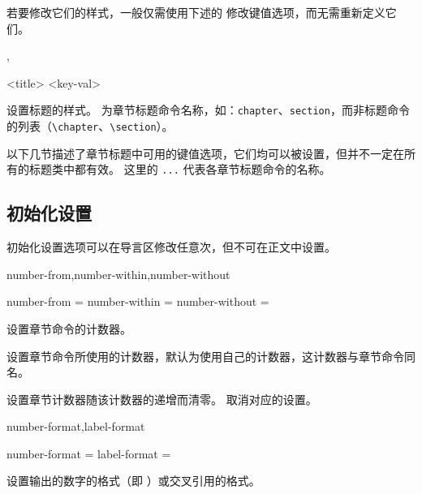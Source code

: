 \documentclass[twoside]{book}
\begin{document}
若要修改它们的样式，一般仅需使用下述的  修改键值选项，而无需重新定义它们。

\begin{function}{\setuponetitle,\setuptitle}
  \begin{syntax}
    \V\setuponetitle <{title}> <{key-val}>
    \V\setuptitle {}
    \V\setuptitle {} 
  \end{syntax}
设置标题的样式。 为章节标题命令名称，如：\verb|chapter|、\verb|section|，而非标题命令的列表（\verb|\chapter|、\verb|\section|）。
\end{function}

以下几节描述了章节标题中可用的键值选项，它们均可以被设置，但并不一定在所有的标题类中都有效。
这里的 \texttt{...} 代表各章节标题命令的名称。


\subsection{初始化设置}

初始化设置选项可以在导言区修改任意次，但不可在正文中设置。

\begin{keyval}[path=title/...]{number-from,number-within,number-without}
  \begin{syntax}
    number-from    = 
    number-within  = 
    number-without = 
  \end{syntax}
设置章节命令的计数器。

 设置章节命令所使用的计数器，默认为使用自己的计数器，这计数器与章节命令同名。

 设置章节计数器随该计数器的递增而清零。 取消对应的设置。
\end{keyval}

\begin{keyval}[path=title/...]{number-format,label-format}
  \begin{syntax}
    number-format = 
    label-format  = 
  \end{syntax}
设置输出的数字的格式（即 ）或交叉引用的格式。
\end{keyval}
\end{document}
